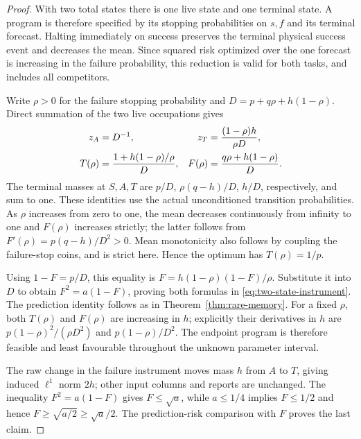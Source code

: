\begin{proof}
With two total states there is one live state and one terminal state. A program is therefore specified by its stopping probabilities on $s,f$ and its terminal forecast. Halting immediately on success preserves the terminal physical success event and decreases the mean. Since squared risk optimized over the one forecast is increasing in the failure probability, this reduction is valid for both tasks, and includes all competitors.

Write $\rho>0$ for the failure stopping probability and
$D=p+q\rho+h(1-\rho)$. Direct summation of the two live occupations gives
\begin{align}
 z_A&=D^{-1},&z_T&=\frac{(1-\rho)h}{\rho D},\notag\\
 T(\rho)&=\frac{1+h(1-\rho)/\rho}{D},&
 F(\rho)&=\frac{q\rho+h(1-\rho)}{D}.
 \label{eq:instrument-occupations}
\end{align}
The terminal masses at $S,A,T$ are $p/D$, $\rho(q-h)/D$, $h/D$, respectively, and sum to one. These identities use the actual unconditioned transition probabilities. As $\rho$ increases from zero to one, the mean decreases continuously from infinity to one and $F(\rho)$ increases strictly; the latter follows from $F'(\rho)=p(q-h)/D^2>0$. Mean monotonicity also follows by coupling the failure-stop coins, and is strict here. Hence the optimum has $T(\rho)=1/p$.

Using $1-F=p/D$, this equality is
$F=h(1-\rho)(1-F)/\rho$. Substitute it into $D$ to obtain
$F^2=a(1-F)$, proving both formulas in \eqref{eq:two-state-instrument}. The prediction identity follows as in Theorem~\ref{thm:rare-memory}. For a fixed $\rho$, both $T(\rho)$ and $F(\rho)$ are increasing in $h$; explicitly their derivatives in $h$ are $p(1-\rho)^2/(\rho D^2)$ and $p(1-\rho)/D^2$. The endpoint program is therefore feasible and least favourable throughout the unknown parameter interval.

The raw change in the failure instrument moves mass $h$ from $A$ to $T$, giving induced $\ell^1$ norm $2h$; other input columns and reports are unchanged. The inequality $F^2=a(1-F)$ gives $F\le\sqrt a$, while $a\le1/4$ implies $F\le1/2$ and hence $F\ge\sqrt{a/2}\ge\sqrt a/2$. The prediction-risk comparison with $F$ proves the last claim.
\end{proof}

